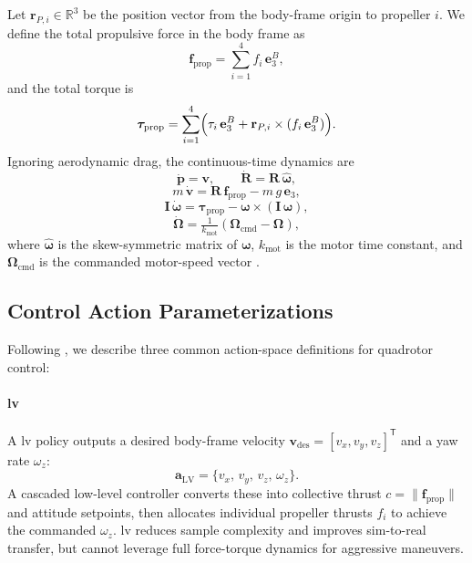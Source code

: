 Let \(\mathbf{r}_{P,i}\in \mathbb{R}^{3}\) be the position vector from the body-frame origin to propeller \(i\). We define the total propulsive force in the body frame as
\begin{equation}
\mathbf{f}_{\mathrm{prop}} = \sum_{i=1}^4 f_i\,\mathbf{e}_3^B,
\end{equation}
and the total torque is
\begin{equation}
\boldsymbol{\tau}_{\mathrm{prop}} = \sum_{i=1}^4 \Bigl(\tau_i\,\mathbf{e}_3^B + \mathbf{r}_{P,i}\times(f_i\,\mathbf{e}_3^B)\Bigr).
\end{equation}
Ignoring aerodynamic drag, the continuous-time dynamics are
\begin{equation}
\dot{\mathbf{p}} = \mathbf{v}, 
\qquad
\dot{\mathbf{R}} = \mathbf{R}\,\widehat{\boldsymbol{\omega}},
\end{equation}
\begin{equation}
m\,\dot{\mathbf{v}} = \mathbf{R}\,\mathbf{f}_{\mathrm{prop}} - m\,g\,\mathbf{e}_3,
\end{equation}
\begin{equation}
\mathbf{I}\,\dot{\boldsymbol{\omega}} = \boldsymbol{\tau}_{\mathrm{prop}} - \boldsymbol{\omega} \times (\mathbf{I}\,\boldsymbol{\omega}),
\end{equation}
\begin{equation}
\dot{\boldsymbol{\Omega}} = \tfrac{1}{k_{\mathrm{mot}}}(\boldsymbol{\Omega}_{\mathrm{cmd}} - \boldsymbol{\Omega}),
\end{equation}
where \(\widehat{\boldsymbol{\omega}}\) is the skew-symmetric matrix of \(\boldsymbol{\omega}\), \(k_{\mathrm{mot}}\) is the motor time constant, and \(\boldsymbol{\Omega}_{\mathrm{cmd}}\) is the commanded motor-speed vector \cite{kaufmann_benchmark_2022}.

\subsection{Control Action Parameterizations}
\label{sec:quadrotor_actions}
Following \cite{kaufmann_benchmark_2022}, we describe three common action-space definitions for quadrotor control:

\paragraph{\gls{lv}}  
A \gls{lv} policy outputs a desired body-frame velocity \(\mathbf{v}_{\mathrm{des}}=[v_x,v_y,v_z]^\mathsf{T}\) and a yaw rate \(\omega_z\):
\begin{equation}
\mathbf{a}_{\mathrm{LV}} = \{v_x,\,v_y,\,v_z,\,\omega_z\}.
\end{equation}
A cascaded low-level controller converts these into collective thrust \(c=\|\mathbf{f}_{\mathrm{prop}}\|\) and attitude setpoints, then allocates individual propeller thrusts \(f_i\) to achieve the commanded \(\omega_z\). \gls{lv} reduces sample complexity and improves sim-to-real transfer, but cannot leverage full force-torque dynamics for aggressive maneuvers.

